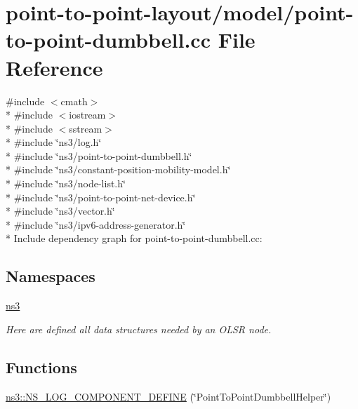 \hypertarget{point-to-point-dumbbell_8cc}{}\section{point-\/to-\/point-\/layout/model/point-\/to-\/point-\/dumbbell.cc File Reference}
\label{point-to-point-dumbbell_8cc}
{\ttfamily \#include $<$cmath$>$}\\*
{\ttfamily \#include $<$iostream$>$}\\*
{\ttfamily \#include $<$sstream$>$}\\*
{\ttfamily \#include \char`\"{}ns3/log.\+h\char`\"{}}\\*
{\ttfamily \#include \char`\"{}ns3/point-\/to-\/point-\/dumbbell.\+h\char`\"{}}\\*
{\ttfamily \#include \char`\"{}ns3/constant-\/position-\/mobility-\/model.\+h\char`\"{}}\\*
{\ttfamily \#include \char`\"{}ns3/node-\/list.\+h\char`\"{}}\\*
{\ttfamily \#include \char`\"{}ns3/point-\/to-\/point-\/net-\/device.\+h\char`\"{}}\\*
{\ttfamily \#include \char`\"{}ns3/vector.\+h\char`\"{}}\\*
{\ttfamily \#include \char`\"{}ns3/ipv6-\/address-\/generator.\+h\char`\"{}}\\*
Include dependency graph for point-\/to-\/point-\/dumbbell.cc\+:
\subsection*{Namespaces}
\begin{DoxyCompactItemize}
\item 
 \hyperlink{namespacens3}{ns3}
\begin{DoxyCompactList}\small\item\em Here are defined all data structures needed by an O\+L\+SR node. \end{DoxyCompactList}\end{DoxyCompactItemize}
\subsection*{Functions}
\begin{DoxyCompactItemize}
\item 
\hyperlink{namespacens3_aa592d47e40a9bfb3c2fb5019b4db8f48}{ns3\+::\+N\+S\+\_\+\+L\+O\+G\+\_\+\+C\+O\+M\+P\+O\+N\+E\+N\+T\+\_\+\+D\+E\+F\+I\+NE} (\char`\"{}Point\+To\+Point\+Dumbbell\+Helper\char`\"{})
\end{DoxyCompactItemize}

